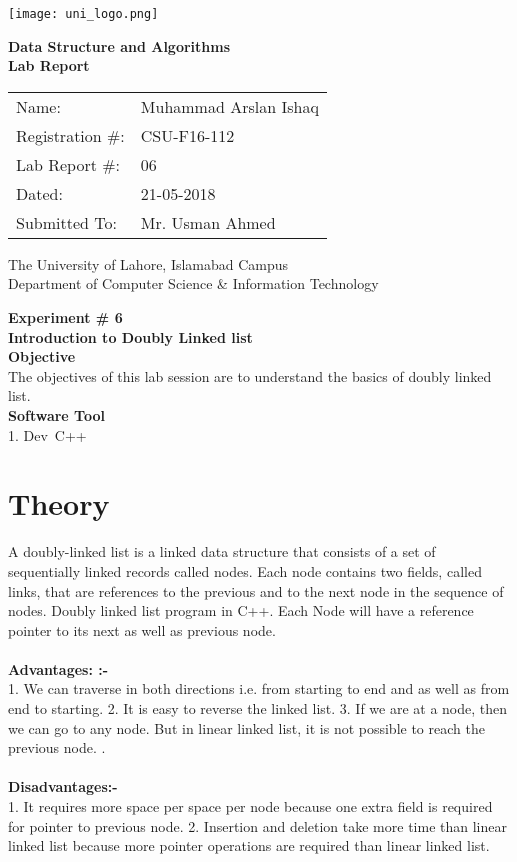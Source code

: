 \documentclass[11pt]{article}            %
\begin{document}
\begin{titlepage}
    \centering
  \vfill
    \texttt{[image: uni\_logo.png]} \\ 
	\vskip2cm
    {\bfseries\Large
	Data Structure and Algorithms \\ 
	
	\vskip2cm
	Lab Report 
	 
	\vskip2cm
	}    

\begin{center}
\begin{tabular}{ l l  } 

Name: & Muhammad Arslan Ishaq \\ 
Registration \#: & CSU-F16-112 \\ 
Lab Report \#: & 06 \\ 
 Dated:& 21-05-2018\\ 
Submitted To:& Mr. Usman Ahmed\\ 

\end{tabular}
\end{center}
    \vfill
    The University of Lahore, Islamabad Campus\\
Department of Computer Science \& Information Technology
\end{titlepage}


    
    {\bfseries\Large
\centering
	Experiment \# 6 \\

Introduction to Doubly Linked list \\
		}    
 \vskip1cm
 \textbf {Objective}\\  The objectives of this lab session are to understand the basics of doubly linked list.\\
 \textbf {Software Tool} \\
1.   Dev\ C++


\section{Theory }              
A doubly-linked list is a linked data structure that consists of a set of sequentially linked records called nodes. Each node contains two fields, called links, that are references to the previous and to the next node in the sequence of nodes. Doubly linked list program in C++. Each Node will have a reference pointer to its next as well as previous node. \\  \\
\textbf{Advantages: :- }\\ 
1. We can traverse in both directions i.e. from starting to end and as well as from end to starting.
2. It is easy to reverse the linked list.
3. If we are at a node, then we can go to any node. But in linear linked list, it is not possible to reach the previous node. .  \\ \\
\textbf{Disadvantages:- }\\
1. It requires more space per space per node because one extra field is required for pointer to previous node.
2. Insertion and deletion take more time than linear linked list because more pointer operations are required than linear linked list. 
\end{document}
